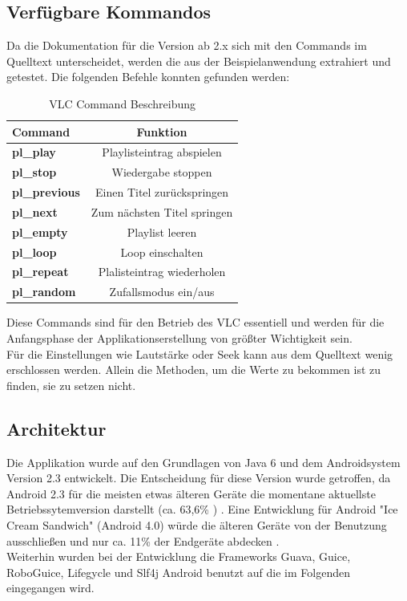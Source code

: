 \documentclass[a4paper,12pt]{article}
\begin{document}
\subsection{Verfügbare Kommandos}
Da die Dokumentation für die Version ab 2.x sich mit den Commands im Quelltext unterscheidet, werden die aus der Beispielanwendung extrahiert und getestet.
Die folgenden Befehle konnten gefunden werden:\\
\begin{table}
\caption{VLC Command Beschreibung}

\begin{center}
\begin{tabular}{|>{\bfseries}l|c|}
  \hline
  Command & Funktion\\
  \hline\hline
  pl\_play & Playlisteintrag abspielen \\
  pl\_stop & Wiedergabe stoppen \\
  pl\_previous & Einen Titel zurückspringen \\
  pl\_next & Zum nächsten Titel springen \\
  pl\_empty & Playlist leeren \\
  pl\_loop & Loop einschalten \\
  pl\_repeat & Plalisteintrag wiederholen \\
  pl\_random & Zufallsmodus ein/aus \\
  \hline
\end{tabular}
\label{tab:vlc_commands}
\end{center}
\end{table}

Diese Commands sind für den Betrieb des VLC essentiell und werden für die Anfangsphase der Applikationserstellung von größter Wichtigkeit sein. \\
Für die Einstellungen wie Lautstärke oder Seek kann aus dem Quelltext wenig erschlossen werden. Allein die Methoden, um die Werte zu bekommen ist zu finden, sie zu setzen nicht.

\newpage
\subsection{Architektur}
Die Applikation wurde auf den Grundlagen von Java 6 und dem Androidsystem Version 2.3 entwickelt. Die Entscheidung für diese Version wurde getroffen, da Android 2.3 für die meisten etwas älteren Geräte die momentane aktuellste Betriebssytemversion darstellt (ca. 63,6\% \cite{marktanteil-android} ) . Eine Entwicklung für Android "Ice Cream Sandwich" (Android 4.0) würde die älteren Geräte von der Benutzung ausschließen und nur ca. 11\% der Endgeräte abdecken \cite{marktanteil-android}. \\
Weiterhin wurden bei der Entwicklung die Frameworks Guava, Guice, RoboGuice, Lifegycle und Slf4j Android benutzt auf die im Folgenden eingegangen wird.
\end{document}
